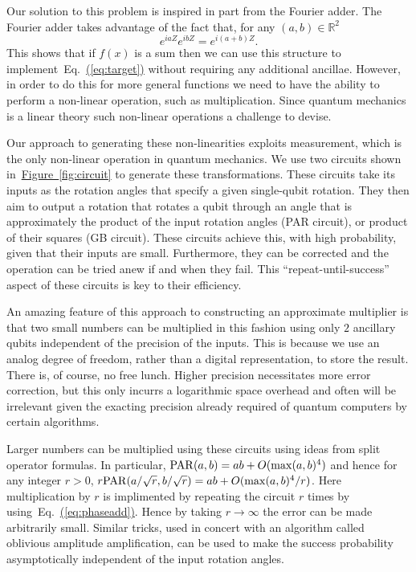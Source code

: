 \documentclass[conference]{IEEEtran}
\newcommand{\eq}[1]{Eq.~\hyperref[eq:#1]{(\ref*{eq:#1})}}
\newcommand{\fig}[1]{\hyperref[fig:#1]{Figure~\ref*{fig:#1}}}
\begin{document}
Our solution to this problem is inspired in part from the Fourier adder.  The Fourier adder takes advantage of the fact that, for any $(a,b) \in \mathbb{R}^2$
\begin{equation}
e^{ia Z} e^{ib Z} =e^{i(a+b)Z}.\label{eq:phaseadd}
\end{equation}
This shows that if $f(x)$ is a sum then we can use this structure to implement~\eq{target} without requiring any additional ancillae.  However, in order to do this for more general functions we need to have the ability to perform a non-linear operation, such as multiplication.  Since quantum mechanics is a linear theory such non-linear operations a challenge to devise.

Our approach to generating these non-linearities exploits measurement, which is the only non-linear operation in quantum mechanics.  We use two circuits shown in~\fig{circuit} to generate these transformations.  These circuits take its inputs as the rotation angles that specify a given single-qubit rotation.  They then aim to output a rotation that rotates a qubit through an angle that is approximately the product of the input rotation angles (PAR circuit), or product of their squares (GB circuit).  These circuits achieve this, with high probability, given that their inputs are small.  Furthermore, they can be corrected and the operation can be tried anew if and when they fail.  This ``repeat-until-success'' aspect of these circuits is key to their efficiency.

An amazing feature of this approach to constructing an approximate multiplier is that two small numbers can be multiplied in this fashion using only $2$ ancillary qubits independent of the precision of the inputs.  This is because we use an analog degree of freedom, rather than a digital representation, to store the result.  There is, of course, no free lunch.  Higher precision necessitates more error correction, but this only incurrs a logarithmic space overhead and often will be irrelevant given the exacting precision already required of quantum computers by certain algorithms.

Larger numbers can be multiplied using these circuits using ideas from split operator formulas.  In particular, ${\rm PAR}( a,b) = ab + O(\max(a,b)^4)$ and hence for any integer $r>0$,
$r{\rm PAR}(a/\sqrt{r},b/\sqrt{r})=ab + O(\max(a,b)^4/r)$.  Here multiplication by $r$ is implimented by repeating the circuit $r$ times by using~\eq{phaseadd}.  Hence by taking $r\rightarrow \infty$ the error can be made arbitrarily small.  Similar tricks, used in concert with an algorithm called oblivious amplitude amplification, can be used to make the success probability asymptotically independent of the input rotation angles.
\end{document}
